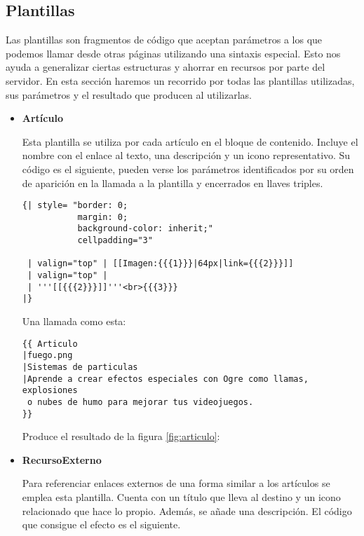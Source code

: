 \subsection{Plantillas}

Las plantillas son fragmentos de código que aceptan parámetros a los que
podemos llamar desde otras páginas utilizando una sintaxis especial. Esto nos
ayuda a generalizar ciertas estructuras y ahorrar en recursos por parte del
servidor. En esta sección haremos un recorrido por todas las plantillas utilizadas,
sus parámetros y el resultado que producen al utilizarlas.\\

\begin{itemize}
    \item \textbf{Artículo}
    
    Esta plantilla se utiliza por cada artículo en el bloque de contenido.
    Incluye el nombre con el enlace al texto, una descripción y un icono
    representativo. Su código es el siguiente, pueden verse los parámetros
    identificados por su orden de aparición en la llamada a la plantilla
    y encerrados en llaves triples.
    
    \begin{lstlisting}[style=wiki]
{| style= "border: 0;
           margin: 0;
           background-color: inherit;"
           cellpadding="3"
           
 | valign="top" | [[Imagen:{{{1}}}|64px|link={{{2}}}]]
 | valign="top" | 
 | '''[[{{{2}}}]]'''<br>{{{3}}}
|}
    \end{lstlisting}
    
    Una llamada como esta:

    \begin{lstlisting}[style=wiki]
{{ Articulo
|fuego.png
|Sistemas de particulas
|Aprende a crear efectos especiales con Ogre como llamas, explosiones
 o nubes de humo para mejorar tus videojuegos.
}}
    \end{lstlisting}

    Produce el resultado de la figura \ref{fig:articulo}:\\
    

    
    \item \textbf{RecursoExterno}
    
    Para referenciar enlaces externos de una forma similar a los artículos
    se emplea esta plantilla. Cuenta con un título que lleva al destino
    y un icono relacionado que hace lo propio. Además, se añade una descripción.
    El código que consigue el efecto es el siguiente.
    

\end{itemize}
